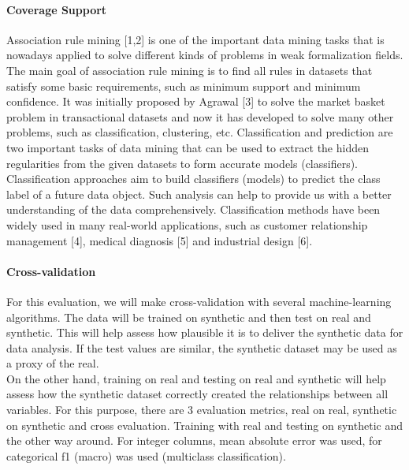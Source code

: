 \documentclass{article}
\begin{document}
\paragraph{Coverage Support}
Association rule mining [1,2] is one of the important data mining tasks that is nowadays applied to solve different kinds of problems in weak formalization fields. The main goal of association rule mining is to find all rules in datasets that satisfy some basic requirements, such as minimum support and minimum confidence. It was initially proposed by Agrawal [3] to solve the market basket problem in transactional datasets and now it has developed to solve many other problems, such as classification, clustering, etc. Classification and prediction are two important tasks of data mining that can be used to extract the hidden regularities from the given datasets to form accurate models (classifiers). Classification approaches aim to build classifiers (models) to predict the class label of a future data object. Such analysis can help to provide us with a better understanding of the data comprehensively. Classification methods have been widely used in many real-world applications, such as customer relationship management [4], medical diagnosis [5] and industrial design [6].

\paragraph{Cross-validation}
For this evaluation, we will make cross-validation with several machine-learning algorithms.
The data will be trained on synthetic and then test on real and synthetic. This will help assess how plausible it is to deliver the synthetic data for data analysis. If the test values are similar, the synthetic dataset may be used as a proxy of the real.\\
On the other hand, training on real and testing on real and synthetic will help assess how the synthetic dataset correctly created the relationships between all variables.
For this purpose, there are 3 evaluation metrics, real on real, synthetic on synthetic and cross evaluation. Training with real and testing on synthetic and the other way around. For integer columns, mean absolute error was used, for categorical f1 (macro) was used (multiclass classification).\\
\end{document}
